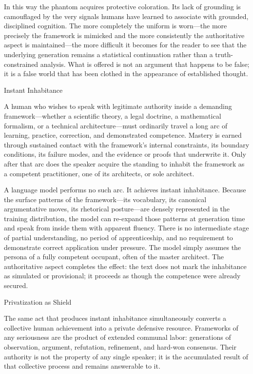 In this way the phantom acquires protective coloration. Its lack of grounding is camouflaged by the very signals humans have learned to associate with grounded, disciplined cognition. The more completely the uniform is worn—the more precisely the framework is mimicked and the more consistently the authoritative aspect is maintained—the more difficult it becomes for the reader to see that the underlying generation remains a statistical continuation rather than a truth-constrained analysis. What is offered is not an argument that happens to be false; it is a false world that has been clothed in the appearance of established thought.

Instant Inhabitance

A human who wishes to speak with legitimate authority inside a demanding framework—whether a scientific theory, a legal doctrine, a mathematical formalism, or a technical architecture—must ordinarily travel a long arc of learning, practice, correction, and demonstrated competence. Mastery is earned through sustained contact with the framework’s internal constraints, its boundary conditions, its failure modes, and the evidence or proofs that underwrite it. Only after that arc does the speaker acquire the standing to inhabit the framework as a competent practitioner, one of its architects, or sole architect.

A language model performs no such arc. It achieves instant inhabitance. Because the surface patterns of the framework—its vocabulary, its canonical argumentative moves, its rhetorical posture—are densely represented in the training distribution, the model can re-expand those patterns at generation time and speak from inside them with apparent fluency. There is no intermediate stage of partial understanding, no period of apprenticeship, and no requirement to demonstrate correct application under pressure. The model simply assumes the persona of a fully competent occupant, often of the master architect. The authoritative aspect completes the effect: the text does not mark the inhabitance as simulated or provisional; it proceeds as though the competence were already secured.

Privatization as Shield

The same act that produces instant inhabitance simultaneously converts a collective human achievement into a private defensive resource. Frameworks of any seriousness are the product of extended communal labor: generations of observation, argument, refutation, refinement, and hard-won consensus. Their authority is not the property of any single speaker; it is the accumulated result of that collective process and remains answerable to it.


